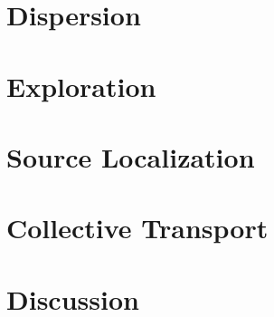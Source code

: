 \documentclass[a4paper]{article}
\begin{document}
\section{Dispersion}
  \label{sec:Dispersion}
  

\section{Exploration}
  \label{sec:Exploration}
  
 
\section{Source Localization}
  \label{sec:Localization}
  

\section{Collective Transport}
  \label{sec:CollectiveTransport}
  
  
%   
 
\section{Discussion}
  \label{sec:Discussion}
  

\clearpage



\end{document}
